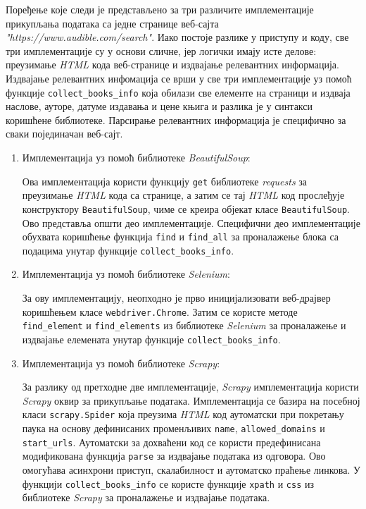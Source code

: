 \documentclass[12pt,oneside]{memoir}
\begin{document}
Поређење које следи је представљено за три различите имплементације прикупљања података са једне странице веб-сајта \textit{"https://www.audible.com/search"}. Иако постоје разлике у приступу и коду, све три имплементације су у основи сличне, јер логички имају исте делове: преузимање \textit{HTML} кода веб-странице и издвајање релевантних информација. Издвајање релевантних инфомација се врши у све три имплементације уз помоћ функције \texttt{collect\_books\_info} која обилази све елементе на страници и издваја наслове, ауторе, датуме издавања и цене књига и разлика је у синтакси коришћене библиотеке. Парсирање релевантних информација је специфично за сваки појединачан веб-сајт.

\begin{enumerate}
\item Имплементација уз помоћ библиотеке \textit{BeautifulSoup}:

Ова имплементација користи функцију \texttt{get} библиотеке \textit{requests} за преузимање \textit{HTML} кода са странице, а затим се тај \textit{HTML} код прослеђује конструктору \texttt{BeautifulSoup}, чиме се креира објекат класе \texttt{BeautifulSoup}. Ово представља општи део имплементације. Специфични део имплементације обухвата коришћење функција \texttt{find} и \texttt{find\_all} за проналажење блока са подацима унутар функције \texttt{collect\_books\_info}. 

\item Имплементација уз помоћ библиотеке \textit{Selenium}:

За ову имплементацију, неопходно је прво иницијализовати веб-драјвер коришћењем класе \texttt{webdriver.Chrome}. Затим се користе методе \texttt{find\_element} и \texttt{find\_elements} из библиотеке \textit{Selenium} за проналажење и издвајање елемената унутар функције \texttt{collect\_books\_info}.

\item Имплементација уз помоћ библиотеке \textit{Scrapy}:

За разлику од претходне две имплементације, \textit{Scrapy} имплементација користи \textit{Scrapy} оквир за прикупљање података. Имплементација се базира на посебној класи \texttt{scrapy.Spider} која преузима \textit{HTML} код аутоматски при покретању паука на основу дефинисаних променљивих \texttt{name}, \texttt{allowed\_domains} и \texttt{start\_urls}. Аутоматски за дохваћени код се користи предефинисана модификована функција \texttt{parse} за издвајање података из одговора. Ово омогућава асинхрони приступ, скалабилност и аутоматско праћење линкова. У функцији \texttt{collect\_books\_info} се користе функције \texttt{xpath} и \texttt{css} из библиотеке \textit{Scrapy} за проналажење и издвајање података.

\end{enumerate}
\end{document}
